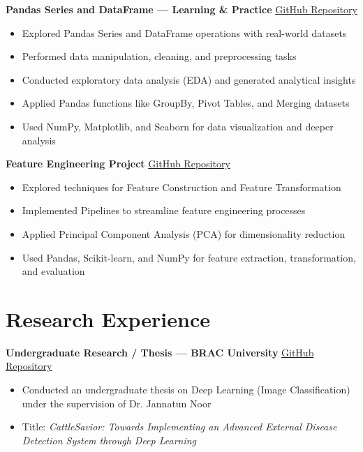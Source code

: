 \documentclass[11.5pt,a4paper]{article}
\newcommand{\projectitem}[2]{%
  \noindent\textbf{#1} \hfill \textcolor{subtext}{\href{#2}{GitHub Repository}}\par
}
\begin{document}
\vspace{10pt}
\projectitem{Pandas Series and DataFrame --- Learning \& Practice}{https://github.com/ShahidulHaqueShaheeen/Exploring-Data-with-Pandas.git}
\begin{itemize}
    \item Explored Pandas Series and DataFrame operations with real-world datasets
    \item Performed data manipulation, cleaning, and preprocessing tasks
    \item Conducted exploratory data analysis (EDA) and generated analytical insights
    \item Applied Pandas functions like GroupBy, Pivot Tables, and Merging datasets
    \item Used NumPy, Matplotlib, and Seaborn for data visualization and deeper analysis
\end{itemize}

\vspace{10pt}
\projectitem{Feature Engineering Project}{https://github.com/ShahidulHaqueShaheeen/Feature_Engineering.git}
\begin{itemize}
    \item Explored techniques for Feature Construction and Feature Transformation
    \item Implemented Pipelines to streamline feature engineering processes
    \item Applied Principal Component Analysis (PCA) for dimensionality reduction
    \item Used Pandas, Scikit-learn, and NumPy for feature extraction, transformation, and evaluation
\end{itemize}

\section*{Research Experience}

\projectitem{Undergraduate Research / Thesis --- BRAC University}{https://github.com/ShahidulHaqueShaheeen/Research_Thesis.git}
\begin{itemize}
    \item Conducted an undergraduate thesis on Deep Learning (Image Classification) under the supervision of Dr. Jannatun Noor
    \item Title: \textit{CattleSavior: Towards Implementing an Advanced External Disease Detection System through Deep Learning}
\end{itemize}
\end{document}
